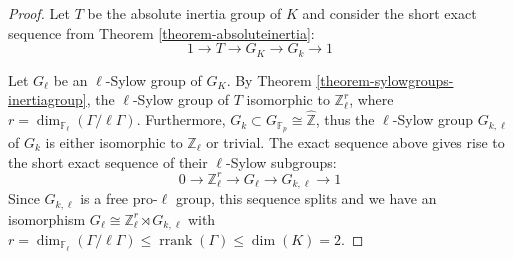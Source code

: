 \begin{proof}
Let $T$ be the absolute inertia group of $K$ and consider the short exact sequence from Theorem \ref{theorem-absoluteinertia}:
\[ 1\longrightarrow T\longrightarrow G_K\longrightarrow G_k\longrightarrow 1 \]

Let $G_\ell$ be an $\ell$-Sylow group of $G_K$. By Theorem \ref{theorem-sylowgroups-inertiagroup}, the $\ell$-Sylow group of $T$ isomorphic to $\mathbb{Z}_\ell^r$, where $r =\dim_{\mathbb{F}_\ell}(\Gamma/\ell\Gamma)$. Furthermore, $G_k\subset G_{\mathbb{F}_p}\cong\hat{\mathbb{Z}}$, thus the $\ell$-Sylow group $G_{k,\ell}$ of $G_k$ is either isomorphic to $\mathbb{Z}_\ell$ or trivial. The exact sequence above gives rise to the short exact sequence of their $\ell$-Sylow subgroups:
\[ 0\longrightarrow\mathbb{Z}_\ell^r \longrightarrow G_\ell \longrightarrow G_{k,\ell}\longrightarrow 1 \]
Since $G_{k,\ell}$ is a free pro-$\ell$ group, this sequence splits and we have an isomorphism $G_\ell \cong \mathbb{Z}_\ell^r\rtimes G_{k,\ell}$ with $r =\dim_{\mathbb{F}_\ell}(\Gamma/\ell\Gamma)\leq \operatorname{rrank}(\Gamma)\leq \dim(K)= 2$.


\end{proof}
